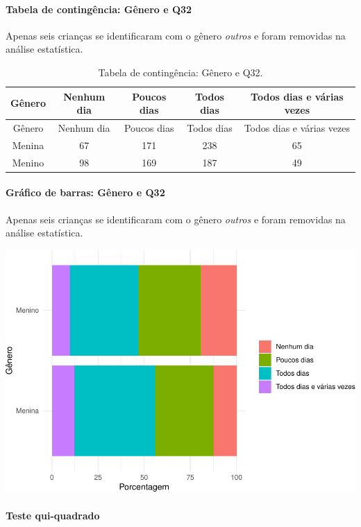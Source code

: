 \documentclass[]{article}
\let\oldparagraph\paragraph
\renewcommand{\paragraph}[1]{\oldparagraph{#1}\mbox{}}
\begin{document}
\cleardoublepage

\hypertarget{tabela-de-continguxeancia-guxeanero-e-q32}{%
\paragraph{Tabela de contingência: Gênero e Q32}\label{tabela-de-continguxeancia-guxeanero-e-q32}}

Apenas seis crianças se identificaram com o gênero \emph{outros} e foram removidas na análise estatística.

\begin{longtable}[]{@{}ccccc@{}}
\caption{\label{tab:unnamed-chunk-1084}Tabela de contingência: Gênero e Q32.}\tabularnewline
\toprule
Gênero & Nenhum dia & Poucos dias & Todos dias & Todos dias e várias vezes\tabularnewline
\midrule
\endfirsthead
\toprule
Gênero & Nenhum dia & Poucos dias & Todos dias & Todos dias e várias vezes\tabularnewline
\midrule
\endhead
Menina & 67 & 171 & 238 & 65\tabularnewline
Menino & 98 & 169 & 187 & 49\tabularnewline
\bottomrule
\end{longtable}

\hypertarget{gruxe1fico-de-barras-guxeanero-e-q32}{%
\paragraph{Gráfico de barras: Gênero e Q32}\label{gruxe1fico-de-barras-guxeanero-e-q32}}

Apenas seis crianças se identificaram com o gênero \emph{outros} e foram removidas na análise estatística.

\begin{center}\includegraphics[width=0.75\linewidth]{relatorio_covid19_files/figure-latex/unnamed-chunk-1085-1} \end{center}

\hypertarget{teste-qui-quadrado-93}{%
\paragraph{Teste qui-quadrado}\label{teste-qui-quadrado-93}}
\end{document}
